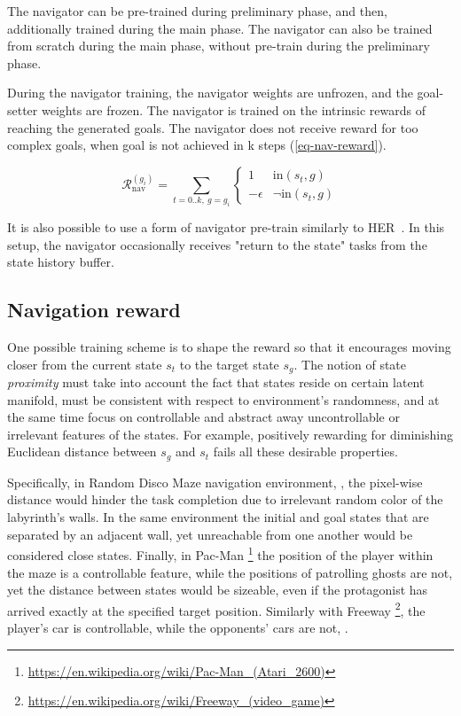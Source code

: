 \documentclass[acmsmall, nonacm]{acmart}
\begin{document}
The navigator can be pre-trained during preliminary phase, and then, additionally trained during the main phase. The navigator can also be trained from scratch during the main phase, without pre-train during the preliminary phase.

During the navigator training, the navigator weights are unfrozen, and the goal-setter weights are frozen. The navigator is trained on the intrinsic rewards of reaching the generated goals. The navigator does not receive reward for too complex goals, when goal is not achieved in k steps (\ref{eq-nav-reward}).

\begin{equation} \label{eq-nav-reward}
\mathcal{R}_\mathrm{nav}^{(g_i)}= \sum_{t=0..k,\ g=g_i}
\begin{cases}
1 & \mathrm{in}(s_t, g) \\
-\epsilon & \lnot \mathrm{in}(s_t, g)
\end{cases}
\end{equation}

It is also possible to use a form of navigator pre-train similarly to HER~\citep{andrychowicz_hindsight_2017}. In this setup, the navigator occasionally receives "return to the state" tasks from the state history buffer.

\subsection{Navigation reward}
\label{ssub:navigation_reward}

One possible training scheme is to shape the reward so that it encourages moving closer from the current state $s_t$ to the target state $s_g$. The notion of state \emph{proximity} must take into account the fact that states reside on certain latent manifold, must be consistent with respect to environment's randomness, and at the same time focus on controllable and abstract away uncontrollable or irrelevant features of the states. For example, positively rewarding for diminishing Euclidean distance between $s_g$ and $s_t$ fails all these desirable properties.

Specifically, in Random Disco Maze navigation environment, \citep{badia_never_2020}, the pixel-wise distance would hinder the task completion due to irrelevant random color of the labyrinth's walls. In the same environment the initial and goal states that are separated by an adjacent wall, yet unreachable from one another would be considered close states. Finally, in Pac-Man%
\footnote{
    \url{https://en.wikipedia.org/wiki/Pac-Man_(Atari_2600)}
}
the position of the player within the maze is a controllable feature, while the positions of patrolling ghosts are not, yet the distance between states would be sizeable, even if the protagonist has arrived exactly at the specified target position.
%
Similarly with Freeway%
\footnote{
    \url{https://en.wikipedia.org/wiki/Freeway_(video_game)}
}, the player's car is controllable, while the opponents' cars are not, \citep[fig.~1]{choi_contingency-aware_2019}.
\end{document}
